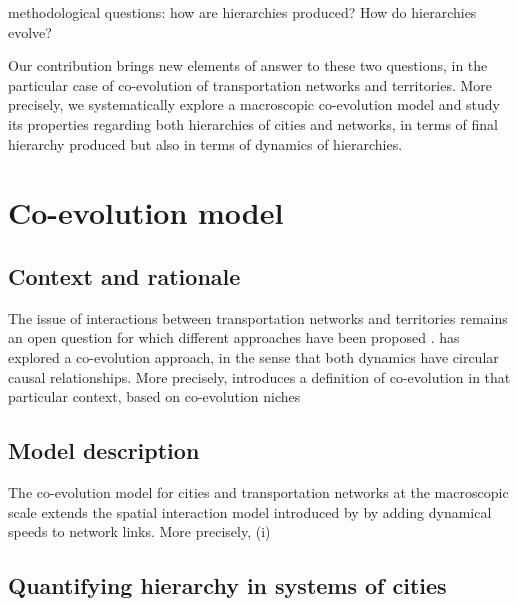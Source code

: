 \documentclass[english,fleqn,allpages]{ISTE_science}[2018/07/30]
\begin{document}
\cite{pumain2006introduction} methodological questions: how are hierarchies produced? How do hierarchies evolve? %

Our contribution brings new elements of answer to these two questions, in the particular case of co-evolution of transportation networks and territories. More precisely, we systematically explore a macroscopic co-evolution model and study its properties regarding both hierarchies of cities and networks, in terms of final hierarchy produced but also in terms of dynamics of hierarchies.


\section{Co-evolution model}

\subsection{Context and rationale}

The issue of interactions between transportation networks and territories remains an open question for which different approaches have been proposed \cite{offner1993effets,espacegeo2014effets}. \cite{raimbault2018caracterisation} has explored a co-evolution approach, in the sense that both dynamics have circular causal relationships. More precisely, \cite{raimbault2019modeling} introduces a definition of co-evolution in that particular context, based on co-evolution niches \cite{holland2012signals}

\cite{raimbault2018modeling}

\subsection{Model description}

The co-evolution model for cities and transportation networks at the macroscopic scale extends the spatial interaction model introduced by \cite{raimbault2018indirect} by adding dynamical speeds to network links. More precisely, (i)  



\subsection{Quantifying hierarchy in systems of cities}

\end{document}
